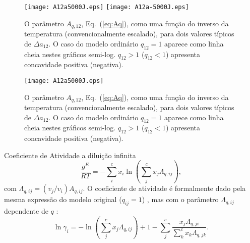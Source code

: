 \documentclass{beamer}
\begin{document}
\begin{frame}

\begin{figure}
\begin{center}
 \texttt{[image: A12a5000J.eps]}
% 
 \texttt{[image: A12a-5000J.eps]}
\end{center}
\caption{\label{fig:A12-1suT}%
         O parâmetro $A_{q,12}$, Eq.~(\protect\ref{eq:Aq}),
         como uma função do inverso da temperatura (convencionalmente escalado),
         para dois valores típicos de  $\Delta a_{12}$.
         O caso do modelo ordinário $q_{12}=1$  aparece como linha cheia 
	 nestes gráficos semi-log. 
         $q_{12}>1$ ($q_{12}<1$) apresenta concavidade positiva (negativa).
}
\end{figure}
\end{frame}

\begin{frame}
\begin{figure}
\begin{center}
 \texttt{[image: A12a5000J.eps]}
\end{center}
\caption{\label{fig:A12-1suT}%
         O parâmetro $A_{q,12}$, Eq.~(\protect\ref{eq:Aq}),
         como uma função do inverso da temperatura (convencionalmente escalado),
         para dois valores típicos de  $\Delta a_{12}$.
         O caso do modelo ordinário $q_{12}=1$  aparece como linha cheia 
	 nestes gráficos semi-log. 
         $q_{12}>1$ ($q_{12}<1$) apresenta concavidade positiva (negativa).
}
\end{figure}
\end{frame}

\begin{frame}{Coeficiente de Atividade a diluição infinita}
%
\begin{equation}
 \frac{g^E}{RT}=-\sum_i^c x_i \ln\left(\sum_j^c x_j \Lambda_{q,ij}\right),
\end{equation}
%
com $\Lambda_{q,ij}=(v_j/v_i)A_{q,ij}$.
%
O coeficiente de atividade é formalmente dado pela mesma expressão  do modelo
original ($q_{ij}=1$) , mas com o parâmetro $\Lambda_{q,ij}$ dependente de $q$ :
%
\begin{equation}
 \ln \gamma_i = -\ln\left(\sum_j^c x_j \Lambda_{q,ij}\right) + 1 
         - \sum_j^c \frac{x_j \Lambda_{q,ji}}{\sum_k^c x_k \Lambda_{q,jk}}.
\end{equation}
%
\end{frame}
\end{document}
